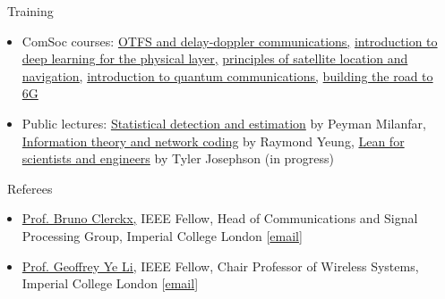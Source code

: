 \documentclass{cv}
\begin{document}
\begin{section}{\faBook\ Training}
	\begin{itemize}
		\item ComSoc courses: \href{https://www.comsoc.org/education-training/training-courses/online-courses/2023-07-otfs-and-delay-doppler-communications}{OTFS and delay-doppler communications,} \href{https://www.comsoc.org/education-training/training-courses/online-courses/2023-05-introduction-deep-learning-physical}{introduction to deep learning for the physical layer,} \href{https://www.comsoc.org/education-training/training-courses/online-courses/2023-05-principles-satellite-location-and}{principles of satellite location and navigation,} \href{https://www.comsoc.org/education-training/training-courses/online-courses/2023-05-introduction-quantum-communications}{introduction to quantum communications,} \href{https://www.comsoc.org/education-training/training-courses/online-courses/2023-05-building-road-6g-full-5g-advanced-beyond}{building the road to 6G}
		\item Public lectures: \href{https://www.youtube.com/playlist?list=PLP2nvIJw7iMkmZfordrpFjbRu114W53zd}{Statistical detection and estimation} by Peyman Milanfar, \href{https://www.youtube.com/playlist?list=PLZDU8a6AcnuixlMLNuqvQSS7PDUK8pZmO}{Information theory and network coding} by Raymond Yeung, \href{https://docs.google.com/spreadsheets/d/1ATL-RngI3IGM6uM1ZkXxQdZzYLOAxSn5ZN0MBrfq--o/edit}{Lean for scientists and engineers} by Tyler Josephson (in progress)
	\end{itemize}
\end{section}

\vspace{-1em}

\begin{section}{\faQuoteLeft\ Referees}
	\begin{itemize}
		\item \href{https://profiles.imperial.ac.uk/b.clerckx}{Prof. Bruno Clerckx,} IEEE Fellow, Head of Communications and Signal Processing Group, Imperial College London [\href{mailto:b.clerckx@imperial.ac.uk}{email}]
		\item \href{https://profiles.imperial.ac.uk/geoffrey.li}{Prof. Geoffrey Ye Li,} IEEE Fellow, Chair Professor of Wireless Systems, Imperial College London [\href{mailto:geoffrey.li@imperial.ac.uk}{email}]
	\end{itemize}
\end{section}

\vspace{-1em}
\end{document}
